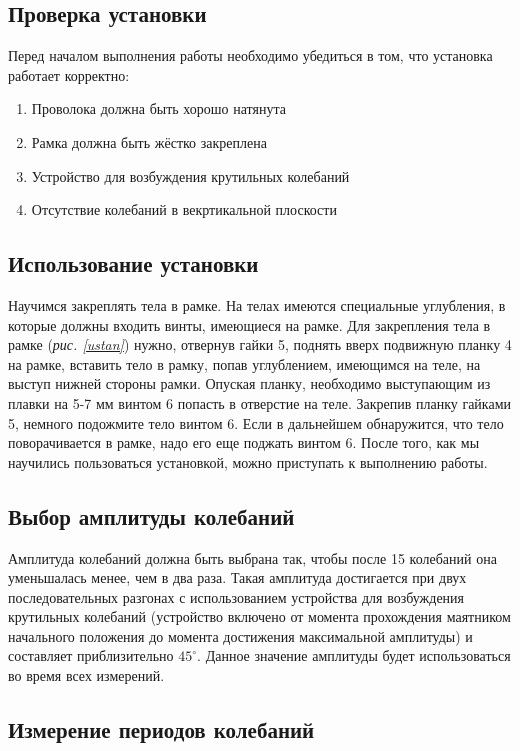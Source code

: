 \documentclass[a4paper, 12pt]{article}
\begin{document}
\subsection{Проверка установки}

Перед началом выполнения работы необходимо убедиться в том, что установка работает корректно:
\begin{enumerate}
    \item Проволока должна быть хорошо натянута
    \item Рамка должна быть жёстко закреплена
    \item Устройство для возбуждения крутильных колебаний
    \item Отсутствие колебаний в векртикальной плоскости
\end{enumerate}

\subsection{Использование установки}

Научимся закреплять тела в рамке. На телах имеются специальные углубления, в которые должны входить винты, имеющиеся на рамке. Для закрепления тела в рамке (\textit{рис. \ref{ustan}}) нужно, отвернув гайки 5, поднять вверх подвижную планку 4 на рамке, вставить тело в рамку, попав углублением, имеющимся на теле, на выступ нижней стороны рамки. Опуская планку, необходимо выступающим из плавки на 5-7 мм винтом 6 попасть в отверстие на теле. Закрепив планку гайками 5, немного подожмите тело винтом 6. Если в дальнейшем обнаружится, что тело поворачивается в рамке, надо его еще поджать винтом 6. После того, как мы научились пользоваться установкой, можно приступать к выполнению работы.

\subsection{Выбор амплитуды колебаний}

Амплитуда колебаний должна быть выбрана так, чтобы после 15 колебаний она уменьшалась менее, чем в два раза. Такая амплитуда достигается при двух последовательных разгонах с использованием устройства для возбуждения крутильных колебаний (устройство включено от момента прохождения маятником начального положения до момента достижения максимальной амплитуды) и составляет приблизительно $45^\circ$. Данное значение амплитуды будет использоваться во время всех измерений.

\subsection{Измерение периодов колебаний}
\end{document}
